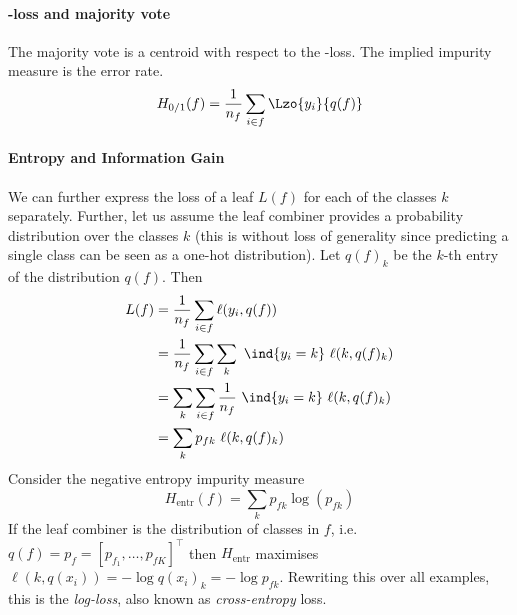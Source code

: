 \documentclass[../main.tex]{subfiles}
\begin{document}
\paragraph{\zeroone-loss and majority vote} The majority vote is a centroid with respect to the \zeroone-loss. The implied impurity measure is the error rate.
$$
H_{0/1}(f) = \frac{1}{n_{f}} \sum_{i \in f} \Lzo{y_{i}}{q(f)}
$$

\paragraph{Entropy and Information Gain} We can further express the loss of a leaf $L(f)$ for each of the classes $k$ separately. Further, let us assume the leaf combiner provides a probability distribution over the classes $k$ (this is without loss of generality since predicting a single class can be seen as a one-hot distribution). Let $q(f)_{k}$ be the $k$-th entry of the distribution $q(f)$. Then
\begin{align}
\begin{split}
\label{eq:leaf-loss-per-class}
L(f) &= \frac{1}{n_{f}} \sum_{i \in f} \ell(y_{i}, q(f)) \\
&= \frac{1}{n_{f}} \sum_{i\in f} \sum_{k} ~\ind{y_{i} = k} ~\ell(k, q(f)_{k}) \\
&= \sum_{k} \sum_{i \in f} \frac{1}{n_{f}} ~\ind{y_{i} = k} ~ \ell(k, q(f)_{k}) \\
&= \sum_{k} p_{fk} ~ \ell(k, q(f)_{k})
\end{split}
\end{align}
Consider the negative entropy impurity measure
$$
H_{\text{entr} }(f)  = \sum_{k} p_{fk} \log(p_{fk})
$$
If the leaf combiner is the distribution of classes in $f$, i.e. $q(f) = p_{f} = [p_{f_{1}}, \dots, p_{fK}]^\top$ then $H_{\text{entr}}$ maximises $\ell(k, q(x_{i})) = - \log q(x_{i})_{k} = -\log p_{fk}$. Rewriting this over all examples, this is the \textit{log-loss}, also known as \textit{cross-entropy} loss.
\end{document}

